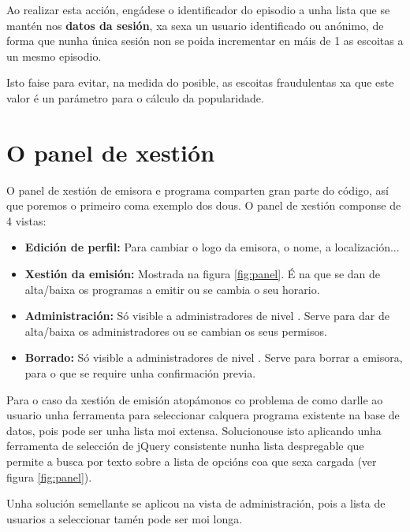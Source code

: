 Ao realizar esta acción, engádese o identificador do episodio a unha lista que se mantén nos \textbf{datos da sesión}, xa sexa un usuario identificado ou anónimo, de forma que nunha única sesión non se poida incrementar en máis de 1 as escoitas a un mesmo episodio. 

Isto faise para evitar, na medida do posible, as escoitas fraudulentas xa que este valor é un parámetro para o cálculo da popularidade.

 

\section{O panel de xestión}

O panel de xestión de emisora e programa comparten gran parte do código, así que poremos o primeiro coma exemplo dos dous. O panel de xestión componse de 4 vistas: 

\begin{itemize}
	\item \textbf{Edición de perfil:} Para cambiar o logo da emisora, o nome, a localización...
	
	\item \textbf{Xestión da emisión:} Mostrada na figura \ref{fig:panel}. É na que se dan de alta/baixa os programas a emitir ou se cambia o seu horario.
	
	\item \textbf{Administración:} Só visible a administradores de nivel . Serve para dar de alta/baixa os administradores ou se cambian os seus permisos.
	
	\item \textbf{Borrado:}  Só visible a administradores de nivel . Serve para borrar a emisora, para o que se require unha confirmación previa.
	
\end{itemize}

Para o caso da xestión de emisión atopámonos co problema de como darlle ao usuario unha ferramenta para seleccionar calquera programa existente na base de datos, pois pode ser unha lista moi extensa. Solucionouse isto aplicando unha ferramenta de selección de jQuery consistente nunha lista despregable que permite a busca por texto sobre a lista de opcións coa que sexa cargada (ver figura \ref{fig:panel}). 

Unha solución semellante se aplicou na vista de administración, pois a lista de usuarios a seleccionar tamén pode ser moi longa.

